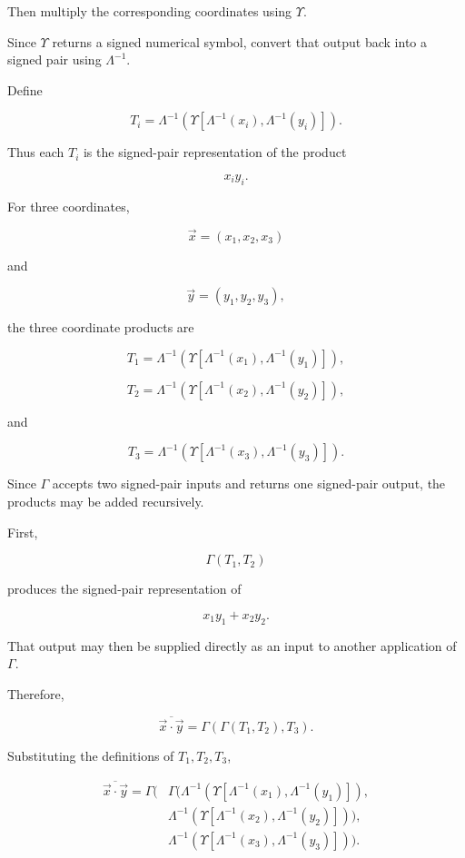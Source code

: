 \documentclass[12pt]{article}
\begin{document}
Then multiply the corresponding coordinates using \(\Upsilon\).

Since \(\Upsilon\) returns a signed numerical symbol, convert that output back into a signed pair using \(\Lambda^{-1}\).

Define

\[
\boxed{
T_i
=
\Lambda^{-1}
\left(
\Upsilon
\left[
\Lambda^{-1}(x_i),
\Lambda^{-1}(y_i)
\right]
\right).
}
\]

Thus each \(T_i\) is the signed-pair representation of the product

\[
x_i y_i.
\]

For three coordinates,

\[
\vec{x}
=
(x_1,x_2,x_3)
\]

and

\[
\vec{y}
=
(y_1,y_2,y_3),
\]

the three coordinate products are

\[
T_1
=
\Lambda^{-1}
\left(
\Upsilon
\left[
\Lambda^{-1}(x_1),
\Lambda^{-1}(y_1)
\right]
\right),
\]

\[
T_2
=
\Lambda^{-1}
\left(
\Upsilon
\left[
\Lambda^{-1}(x_2),
\Lambda^{-1}(y_2)
\right]
\right),
\]

and

\[
T_3
=
\Lambda^{-1}
\left(
\Upsilon
\left[
\Lambda^{-1}(x_3),
\Lambda^{-1}(y_3)
\right]
\right).
\]

Since \(\Gamma\) accepts two signed-pair inputs and returns one signed-pair output, the products may be added recursively.

First,

\[
\Gamma(T_1,T_2)
\]

produces the signed-pair representation of

\[
x_1y_1+x_2y_2.
\]

That output may then be supplied directly as an input to another application of \(\Gamma\).

Therefore,

\[
\boxed{
\overline{\vec{x}\cdot\vec{y}}
=
\Gamma
\left(
\Gamma(T_1,T_2),
T_3
\right).
}
\]

Substituting the definitions of \(T_1,T_2,T_3\),

\[
\boxed{
\begin{aligned}
\overline{\vec{x}\cdot\vec{y}}
=
\Gamma
\Bigg(
&
\Gamma
\Bigg(
\Lambda^{-1}
\left(
\Upsilon
\left[
\Lambda^{-1}(x_1),
\Lambda^{-1}(y_1)
\right]
\right),
\\
&
\Lambda^{-1}
\left(
\Upsilon
\left[
\Lambda^{-1}(x_2),
\Lambda^{-1}(y_2)
\right]
\right)
\Bigg),
\\
&
\Lambda^{-1}
\left(
\Upsilon
\left[
\Lambda^{-1}(x_3),
\Lambda^{-1}(y_3)
\right]
\right)
\Bigg).
\end{aligned}
}
\]
\end{document}
